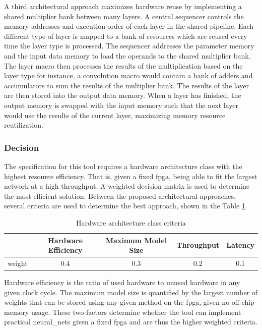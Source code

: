 \documentclass{uw-ece-wkrpt}
\begin{document}
A third architectural approach maximizes hardware reuse by implementing a shared multiplier bank between many layers. A central sequencer controls the memory addresses and execution order of each layer in the shared pipeline. Each different type of layer is mapped to a bank of resources which are reused every time the layer type is processed. The sequencer addresses the parameter memory and the input data memory to load the operands to the shared multiplier bank. The layer macro then processes the results of the multiplication based on the layer type \textemdash{} for instance, a convolution macro would contain a bank of adders and accumulators to sum the results of the multiplier bank. The results of the layer are then stored into the output data memory. When a layer has finished, the output memory is swapped with the input memory such that the next layer would use the results of the current layer, maximizing memory resource reutilization.

\subsubsection{Decision}

The specification for this tool requires a hardware architecture class with the highest resource efficiency. That is, given a fixed \gls{fpga}, being able to fit the largest network at a high throughput. A weighted decision matrix is used to determine the most efficient solution. Between the proposed architectural approaches, several criteria are used to determine the best approach, shown in the Table \ref{tab:hw_arch_criteria}.

\begin{table}
\centering
\caption{Hardware architecture class criteria}\label{tab:hw_arch_criteria}
\begin{tabular}{lcccc}
\toprule
       & Hardware Efficiency & Maximum Model Size & Throughput & Latency \\
\midrule
\Gls{weight} & 0.4 & 0.3 & 0.2 & 0.1 \\
\bottomrule
\end{tabular}
\end{table}

 Hardware efficiency is the ratio of used hardware to unused hardware in any given clock cycle. The maximum model size is quantified by the largest number of weights that can be stored using any given method on the \gls{fpga}, given no off-chip memory usage. These two factors determine whether the tool can implement practical \glspl{neural_net} given a fixed \gls{fpga} and are thus the higher weighted criteria.
\end{document}
